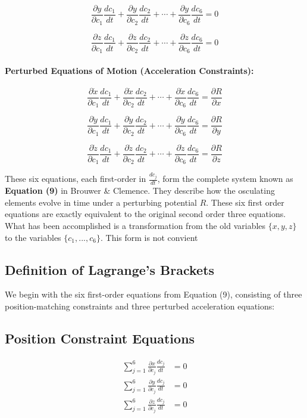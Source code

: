 \documentclass{article}
\begin{document}
\[
\frac{\partial y}{\partial c_1} \frac{dc_1}{dt}
+ \frac{\partial y}{\partial c_2} \frac{dc_2}{dt}
+ \cdots
+ \frac{\partial y}{\partial c_6} \frac{dc_6}{dt} = 0
\]

\[
\frac{\partial z}{\partial c_1} \frac{dc_1}{dt}
+ \frac{\partial z}{\partial c_2} \frac{dc_2}{dt}
+ \cdots
+ \frac{\partial z}{\partial c_6} \frac{dc_6}{dt} = 0
\]

\paragraph{Perturbed Equations of Motion (Acceleration Constraints):}

\[
\frac{\partial \dot{x}}{\partial c_1} \frac{dc_1}{dt}
+ \frac{\partial \dot{x}}{\partial c_2} \frac{dc_2}{dt}
+ \cdots
+ \frac{\partial \dot{x}}{\partial c_6} \frac{dc_6}{dt}
= \frac{\partial R}{\partial x}
\]

\[
\frac{\partial \dot{y}}{\partial c_1} \frac{dc_1}{dt}
+ \frac{\partial \dot{y}}{\partial c_2} \frac{dc_2}{dt}
+ \cdots
+ \frac{\partial \dot{y}}{\partial c_6} \frac{dc_6}{dt}
= \frac{\partial R}{\partial y}
\]

\[
\frac{\partial \dot{z}}{\partial c_1} \frac{dc_1}{dt}
+ \frac{\partial \dot{z}}{\partial c_2} \frac{dc_2}{dt}
+ \cdots
+ \frac{\partial \dot{z}}{\partial c_6} \frac{dc_6}{dt}
= \frac{\partial R}{\partial z}
\]

These six equations, each first-order in \( \frac{dc_j}{dt} \), form the complete system known as \textbf{Equation (9)} in Brouwer \& Clemence. They describe how the osculating elements evolve in time under a perturbing potential \( R \). These six first order equations are exactly equivalent to the original second order three equations. What has been accomplished is a transformation from the old variables $\{x,y,z\}$ to the variables $\{c_1, ..., c_6\}$. This form is not convient

\newpage 
\subsection{Definition of Lagrange's Brackets}

We begin with the six first-order equations from Equation (9), consisting of three position-matching constraints and three perturbed acceleration equations:

\subsection*{Position Constraint Equations}
\begin{align*}
\sum_{j=1}^{6} \frac{\partial x}{\partial c_j} \frac{dc_j}{dt} &= 0 \\
\sum_{j=1}^{6} \frac{\partial y}{\partial c_j} \frac{dc_j}{dt} &= 0 \\
\sum_{j=1}^{6} \frac{\partial z}{\partial c_j} \frac{dc_j}{dt} &= 0
\end{align*}
\end{document}
